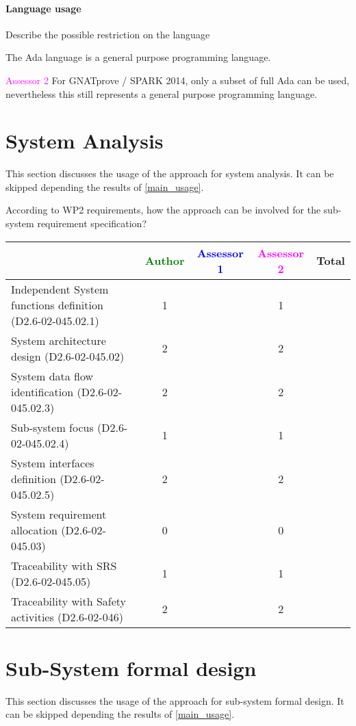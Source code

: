 \paragraph{Language usage} Describe the possible restriction on the language

The Ada language is a general purpose programming language.

\textcolor{magenta}{Assessor 2} For GNATprove / SPARK 2014, only a subset of
full Ada can be used, nevertheless this still represents a general purpose
programming language.

\section{System Analysis}
This section discusses the usage of the approach for system analysis.
It can be skipped depending the results of \ref{main_usage}.

According to WP2 requirements, how the approach can be involved for
the sub-system requirement specification?

\begin{tabular}{|l | c | c | c | c|}
\hline
& \textcolor{green}{Author} & \textcolor{blue}{Assessor 1} & \textcolor{magenta}{Assessor 2} & Total \\
\hline
Independent System functions definition (D2.6-02-045.02.1)  & 1 & & 1 &  \\
\hline
System architecture design (D2.6-02-045.02) & 2 & & 2 &  \\
\hline
System data flow identification (D2.6-02-045.02.3)  & 2 & & 2 &  \\
\hline
Sub-system focus (D2.6-02-045.02.4)  & 1 & & 1 &  \\
\hline
System interfaces definition (D2.6-02-045.02.5)  & 2 & & 2 &  \\
\hline
System requirement allocation (D2.6-02-045.03)  & 0 & & 0 &  \\
\hline
Traceability with SRS (D2.6-02-045.05)  & 1 & & 1 &  \\
\hline
Traceability with Safety activities (D2.6-02-046)  & 2 & & 2 &  \\
\hline
\end{tabular}



\section{Sub-System formal design}
This section discusses the usage of the approach for sub-system formal design.
It can be skipped depending the results of \ref{main_usage}.

